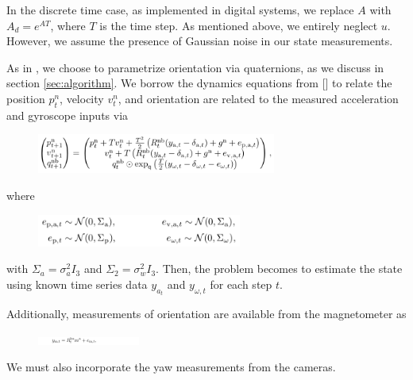 \documentclass{article}
\begin{document}
In the discrete time case, as implemented in digital systems, we replace $A$ with $A_d = e^{AT}$, where $T$ is the time step. As mentioned above, we entirely neglect $u$. However, we assume the presence of Gaussian noise in our state measurements.

As in \cite{introtoiner}, we choose to parametrize orientation via quaternions, as we discuss in section \ref{sec:algorithm}. We borrow the dynamics equations from [\cite{introtoiner}] to relate the position $p_t^n$, velocity $v_t^n$, and orientation are related to the measured acceleration and gyroscope inputs via
\begin{figure}[ht]
  \centering
  \includegraphics[width=0.7\textwidth]{dynamics.png}
\end{figure}

where
\begin{figure}[ht]
  \centering
  \includegraphics[width=0.6\textwidth]{dynamics2.png}
\end{figure}

with $\Sigma_a = \sigma_a^2 I_3$ and $\Sigma_2 = \sigma_w^2 I_3$. Then, the problem becomes to estimate the state using known time series data $y_{a_t}$ and $y_{\omega,t}$ for each step $t$.

Additionally, measurements of orientation are available from the magnetometer as
\begin{figure}[ht]
  \centering
  \includegraphics[width=0.3\textwidth]{dynamics3.png}
\end{figure}

We must also incorporate the yaw measurements from the cameras.
\end{document}
